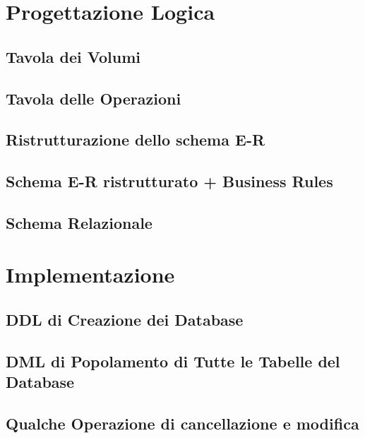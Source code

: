 \documentclass[letterpaper]{report}
\begin{document}
\chapter{Progettazione Logica}
\section{Tavola dei Volumi}



\section{Tavola delle Operazioni}



\section{Ristrutturazione dello schema E-R}



\section{Schema E-R ristrutturato + Business Rules}


\section{Schema Relazionale}

\chapter{Implementazione}
\section{DDL di Creazione dei Database}
\section{DML di Popolamento di Tutte le Tabelle del Database}
\section{Qualche Operazione di cancellazione e modifica}
\end{document}
